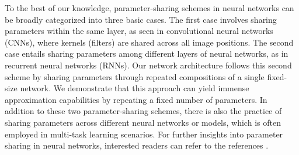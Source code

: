 \documentclass[nohyperref]{article}
\theoremstyle{plain}
\theoremstyle{definition}
\theoremstyle{remark}
\begin{document}
To the best of our knowledge, parameter-sharing schemes in neural networks can be broadly categorized into three basic cases. The first case involves sharing parameters within the same layer, as seen in convolutional neural networks (CNNs), where kernels (filters) are shared across all image positions. The second case entails sharing parameters among different layers of neural networks, as in recurrent neural networks (RNNs). Our network architecture follows this second scheme by sharing parameters through repeated compositions of a single fixed-size network. We demonstrate that this approach can yield immense approximation capabilities by repeating a fixed number of parameters.
In addition to these two parameter-sharing schemes, there is also the practice of sharing parameters across different neural networks or models, which is often employed in multi-task learning scenarios. For further insights into parameter sharing in neural networks, interested readers can refer to the references \cite{savarese2018learning,2020arXiv200902386W,2006.10598,NEURIPS2020_42cd63cb,9859706,9879069}.
\end{document}
